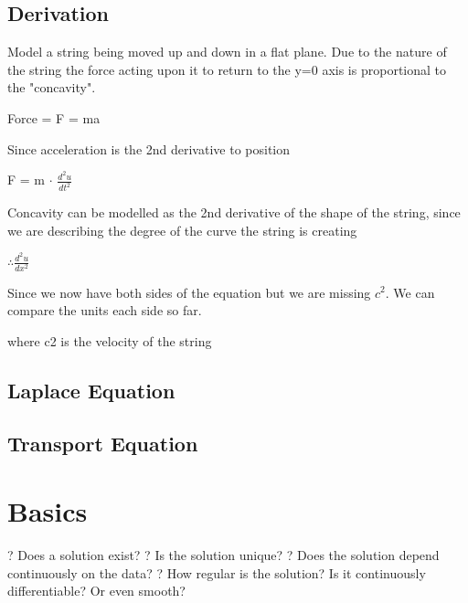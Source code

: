 \documentclass[10pt,a4paper]{report}
\begin{document}
\subsection*{Derivation}

Model a string being moved up and down in a flat plane. Due to the nature of the string the force acting upon it to return to the y=0 axis is proportional to the "concavity".

Force = F = ma

Since acceleration is the 2nd derivative to position

F = m $\cdot$ $\frac{d^2u}{dt^2}$

Concavity can be modelled as the 2nd derivative of the shape of the string, since we are describing the degree of the curve the string is creating

$\therefore \frac{d^2u}{dx^2}$

Since we now have both sides of the equation but we are missing $c^2$. We can compare the units each side so far.

where c2 is the velocity of the string

\subsection{Laplace Equation}

\subsection{Transport Equation}

\section{Basics}
? Does a solution exist?
\newline
? Is the solution unique?
\newline
? Does the solution depend continuously on the data?
\newline
? How regular is the solution? Is it continuously differentiable? Or even
smooth?
\newline
\end{document}
